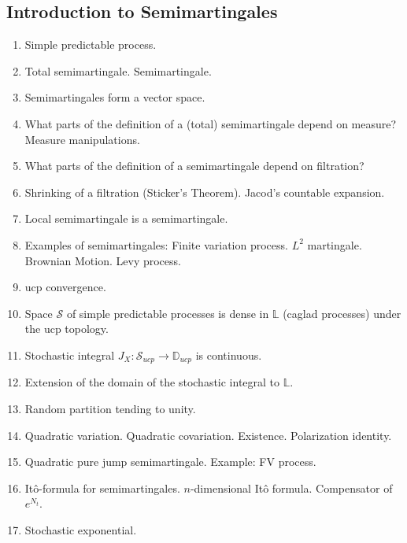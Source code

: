 \documentclass[11pt,oneside]{amsart}
\begin{document}
\subsection{Introduction to Semimartingales}

\begin{enumerate}[resume]
    \item Simple predictable process.
    \item Total semimartingale. Semimartingale.
    \item Semimartingales form a vector space.
    \item What parts of the definition of a (total) semimartingale depend on measure? 
        Measure manipulations.
    \item What parts of the definition of a semimartingale depend on filtration? 
    \item Shrinking of a filtration (Sticker's Theorem). Jacod's countable expansion.
    \item Local semimartingale is a semimartingale.
    \item Examples of semimartingales: Finite variation process. $L^2$ martingale. Brownian Motion. Levy process.
    \item ucp convergence.
    \item Space $\mathcal S$ of simple predictable processes is dense in $\mathbb L$ (caglad processes) under the ucp topology.
    \item Stochastic integral $J_X: \mathcal{S}_{ucp} \to \mathbb{D}_{ucp}$ is continuous.
    \item Extension of the domain of the stochastic integral to $\mathbb L$.
    \item Random partition tending to unity.
    \item Quadratic variation. Quadratic covariation. Existence. Polarization identity.
    \item Quadratic pure jump semimartingale. Example: FV process.
    \item It\^o-formula for semimartingales. $n$-dimensional It\^o formula. Compensator of $e^{N_t}$.
    \item Stochastic exponential.
\end{enumerate}
\end{document}

